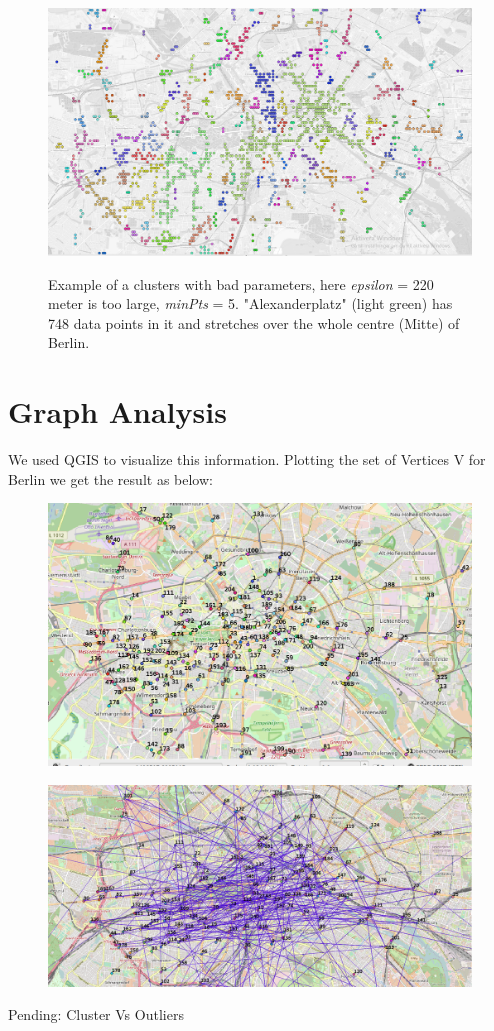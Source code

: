 \begin{figure}[!ht]
	\centering
	\includegraphics[width=1\textwidth]{images/0,002_5_gray.png}\\
	\caption{ Example of a clusters with bad parameters, here \textit{epsilon} = 220 meter is too large, \textit{minPts} = 5. "Alexanderplatz" (light green) has 748 data points in it and stretches over the whole centre (Mitte) of Berlin. }
	\label{fig:002_5_gray}
\end{figure}
\FloatBarrier

\section{Graph Analysis}
We used QGIS to visualize this information. Plotting the set of Vertices V for Berlin we get the result as below:

\begin{figure}[!ht]
	\centering
	\includegraphics[width=.80\textwidth]{images/Simple_Vertex_Plot.png}
	\label{fig:Vertex Plot}
\end{figure} 
\begin{figure}[!ht]
	\centering
	\includegraphics[width=.80\textwidth]{images/BerlinEdgeConnectivity.png}
	\label{fig:Edge Plot}
\end{figure} 

Pending: Cluster Vs Outliers
